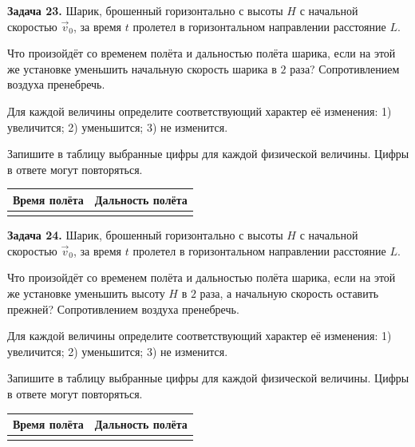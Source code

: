 \begin{taskbasic}[code={\label{task:dem26_v23_n6}}]
\textbf{Задача 23.} Шарик, брошенный горизонтально с высоты $H$ с начальной скоростью $\vec{v}_0$, за время $t$ пролетел в горизонтальном направлении расстояние $L$.

Что произойдёт со временем полёта и дальностью полёта шарика, если на этой же установке уменьшить начальную скорость шарика в $2$ раза? Сопротивлением воздуха пренебречь.

Для каждой величины определите соответствующий характер её изменения:
1) увеличится;
2) уменьшится;
3) не изменится.

Запишите в таблицу выбранные цифры для каждой физической величины. Цифры в ответе могут повторяться.
\begin{center}
\begin{tabular}{|c|c|}
\hline
Время полёта & Дальность полёта \\ \hline
 & \\ \hline
\end{tabular}
\end{center}

\end{taskbasic}

\begin{taskbasic}[code={\label{task:dem26_v24_n6}}]
\textbf{Задача 24.} Шарик, брошенный горизонтально с высоты $H$ с начальной скоростью $\vec{v}_0$, за время $t$ пролетел в горизонтальном направлении расстояние $L$.

Что произойдёт со временем полёта и дальностью полёта шарика, если на этой же установке уменьшить высоту $H$ в $2$ раза, а начальную скорость оставить прежней? Сопротивлением воздуха пренебречь.

Для каждой величины определите соответствующий характер её изменения:
1) увеличится;
2) уменьшится;
3) не изменится.

Запишите в таблицу выбранные цифры для каждой физической величины. Цифры в ответе могут повторяться.
\begin{center}
\begin{tabular}{|c|c|}
\hline
Время полёта & Дальность полёта \\ \hline
 & \\ \hline
\end{tabular}
\end{center}

\end{taskbasic}
